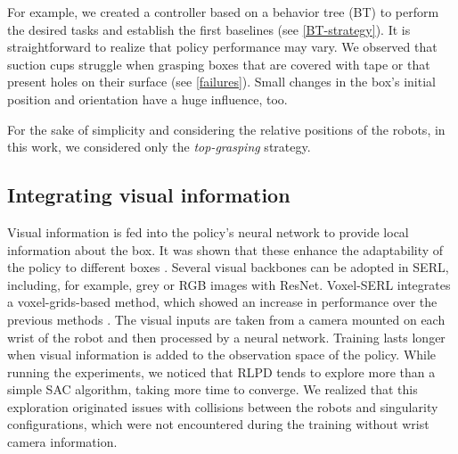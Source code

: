 \documentclass[letterpaper, 10 pt, conference]{ieeeconf}  %
\begin{document}
For example, we created a controller based on a behavior tree (BT) to perform the desired tasks and establish the first baselines (see \cref{BT-strategy}). 
It is straightforward to realize that policy performance may vary. 
We observed that suction cups struggle when grasping boxes that are covered with tape or that present holes on their surface (see \cref{failures}). Small changes in the box's initial position and orientation have a huge influence, too. 


For the sake of simplicity and considering the relative positions of the robots, in this work, we considered only the \textit{top-grasping} strategy.


\subsection{Integrating visual information}\label{visual-info}
Visual information is fed into the policy's neural network to provide local information about the box. It was shown that these enhance the adaptability of the policy to different boxes \cite{kostrikov2021imageaugmentationneedregularizing}. Several visual backbones can be adopted in SERL, including, for example, grey or RGB images with ResNet. Voxel-SERL integrates a voxel-grids-based method, which showed an increase in performance over the previous methods \cite{sutter2025comparisonvisualrepresentationsrealworld}.
The visual inputs are taken from a camera mounted on each wrist of the robot and then processed by a neural network.
Training lasts longer when visual information is added to the observation space of the policy. While running the experiments, we noticed that RLPD tends to explore more than a simple SAC algorithm, taking more time to converge. 
We realized that this exploration originated issues with collisions between the robots and singularity configurations, which were not encountered during the training without wrist camera information. 
\end{document}

